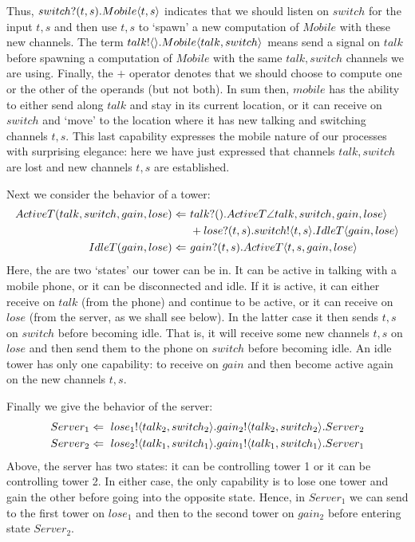 	
	Thus, ${switch}?({t,s}). Mobile\langle t,s\rangle$ indicates that we should listen on $switch$ for the input $t,s$ and then use $t,s$ to `spawn' a new computation of $Mobile$ with these new channels. 
	The term ${talk}!\langle{}\rangle. Mobile\langle talk,switch\rangle$ means send a signal on $talk$ before spawning a computation of $Mobile$ with the same $talk,switch$ channels we are using.  
Finally, the $+$ operator denotes that we should choose to compute one or the other of the operands (but not both).  
In sum then, $mobile$ has the ability to either send along $talk$ and stay in its current location, or it can receive on $switch$ and `move' to the location where it has new talking and switching channels $t,s$.  
This last capability expresses the mobile nature of our processes with surprising elegance: here we have just expressed that channels $talk,switch$ are lost and new channels $t,s$ are established.
	
	Next we consider the behavior of a tower:
	\begin{align*}
		ActiveT(talk,switch,gain,lose) \Leftarrow\  & {talk}?({}).ActiveT\angle talk,switch,gain,lose\rangle \\  
		 & +{lose}?({t,s}).{switch}!\langle{t,s}\rangle.IdleT\langle gain, lose\rangle\\
		IdleT(gain,lose) \Leftarrow\  & {gain}?({t,s}).ActiveT\langle t,s,gain,lose\rangle\\
	\end{align*}
Here, the are two `states' our tower can be in.  
It can be active in talking with a mobile phone, or it can be disconnected and idle.  
If it is active, it can either receive on $talk$ (from the phone) and continue to be active, or it can receive on $lose$ (from the server, as we shall see below).  
In the latter case it then sends $t,s$ on $switch$ before becoming idle.  
That is, it will receive some new channels $t,s$ on $lose$ and then send them to the phone on $switch$ before becoming idle.  
An idle tower has only one capability: to receive on $gain$ and then become active again on the new channels $t,s$.

Finally we give the behavior of the server:
\begin{align*}
	Server_1 \Leftarrow\  {lose_1}!\langle{talk_2,switch_2}\rangle. {gain_2}!\langle{talk_2,switch_2}\rangle. Server_2\\
	Server_2 \Leftarrow\  {lose_2}!\langle{talk_1,switch_1}\rangle. {gain_1}!\langle{talk_1,switch_1}\rangle. Server_1
\end{align*}
Above, the server has two states: it can be controlling tower 1 or it can be controlling tower 2.  
In either case, the only capability is to lose one tower and gain the other before going into the opposite state.  
Hence, in $Server_1$ we can send to the first tower on $lose_1$ and then to the second tower on $gain_2$ before entering state $Server_2$.

